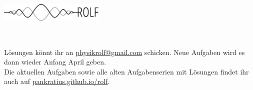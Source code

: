 \documentclass[a4paper]{article}
\begin{document}
	\vspace*{-1cm}
	\parbox{4cm}{\vspace{-0.2cm}\includegraphics[width=5cm]{../images/logo_scaled.pdf}}
	\parbox{10.6cm}{ \\
			 }
		\vspace{0.5cm}
		


\thispagestyle{empty}
\begin{framed}
	\noindent
	\scriptsize
	 Lösungen könnt ihr an \href{mailto:physikrolf@gmail.com}{physikrolf@gmail.com} schicken.
	 Neue Aufgaben wird es dann wieder Anfang April geben.
	 \\ Die aktuellen Aufgaben sowie alle alten Aufgabenserien mit Lösungen findet ihr auch auf \url{pankratius.github.io/rolf}.
\end{framed}

\noindent




\end{document}
